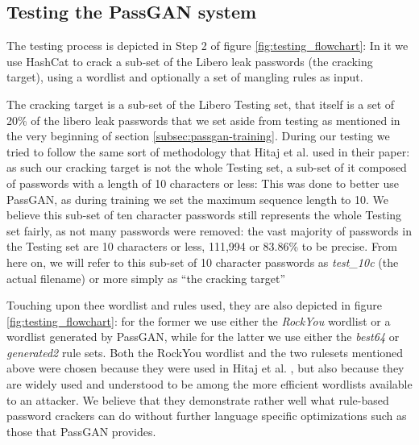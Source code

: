 \subsection{Testing the PassGAN system}\label{subsec:passgan-testing}
The testing process is depicted in Step 2 of figure \ref{fig:testing_flowchart}: In it we use HashCat to crack a sub-set of the Libero leak passwords (the cracking target), using a wordlist and optionally a set of mangling rules as input.

The cracking target is a sub-set of the Libero Testing set, that itself is a set of 20\% of the libero leak passwords that we set aside from testing as mentioned in the very beginning of section \ref{subsec:passgan-training}.
During our testing we tried to follow the same sort of methodology that Hitaj et al.\cite{PassGAN} used in their paper: as such our cracking target is not the whole Testing set, a sub-set of it composed of passwords with a length of 10 characters or less: This was done to better use PassGAN, as during training we set the maximum sequence length to 10.
We believe this sub-set of ten character passwords still represents the whole Testing set fairly, as not many passwords were removed: the vast majority of passwords in the Testing set are 10 characters or less, 111,994 or 83.86\% to be precise. 
From here on, we will refer to this sub-set of 10 character passwords as \emph{test\_10c} (the actual filename) or more simply as \enquote{the cracking target}


Touching upon thee wordlist and rules used, they are also depicted in figure \ref{fig:testing_flowchart}: for the former we use either the \emph{RockYou} wordlist or a wordlist generated by PassGAN, while for the latter we use either the \emph{best64} or \emph{generated2} rule sets. Both the RockYou wordlist and the two rulesets mentioned above were chosen because they were used in Hitaj et al. \cite{PassGAN}, but also because they are widely used and understood to be among the more efficient wordlists available to an attacker. We believe that they demonstrate rather well what rule-based password crackers can do without further language specific optimizations such as those that PassGAN provides. %

